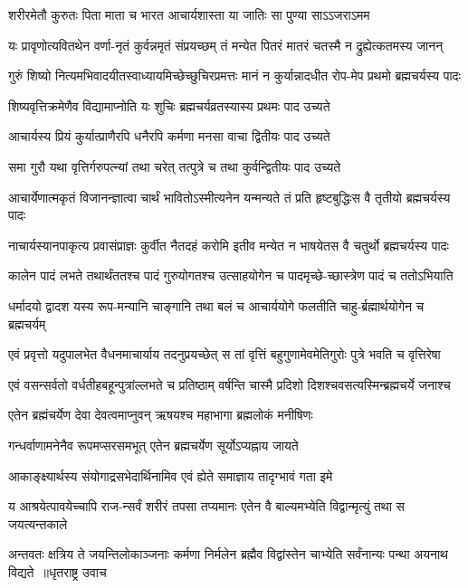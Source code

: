 \twolineshloka
{शरीरमेतौ कुरुतः पिता माता च भारत}
{आचार्यशास्ता या जातिः सा पुण्या साऽऽजराऽमम}


\twolineshloka
{यः प्रावृणोत्यवितथेन वर्णा-नृतं कुर्वन्नमृतं संप्रयच्छम्}
{तं मन्येत पितरं मातरं चतस्मै न द्रुह्येत्कतमस्य जानन्}


\twolineshloka
{गुरुं शिष्यो नित्यमभिवादयीतस्वाध्यायमिच्छेच्छुचिरप्रमत्तः}
{मानं न कुर्यान्नादधीत रोप-मेप प्रथमो ब्रह्मचर्यस्य पादः}


\twolineshloka
{शिष्यवृत्तिक्रमेणैव विद्यामाप्नोति यः शुचिः}
{ब्रह्मचर्यव्रतस्यास्य प्रथमः पाद उच्यते}


\twolineshloka
{आचार्यस्य प्रियं कुर्यात्प्राणैरपि धनैरपि}
{कर्मणा मनसा वाचा द्वितीयः पाद उच्यते}


\twolineshloka
{समा गुरौ यथा वृत्तिर्गरुपत्न्यां तथा चरेत्}
{तत्पुत्रे च तथा कुर्वन्द्वितीयः पाद उच्यते}


\twolineshloka
{आचार्येणात्मकृतं विजानन्ज्ञात्वा चार्थं भावितोऽस्मीत्यनेन}
{यन्मन्यते तं प्रति हृष्टबुद्धिःस वै तृतीयो ब्रह्मचर्यस्य पादः}


\twolineshloka
{नाचार्यस्यानपाकृत्य प्रवासंप्राज्ञः कुर्वीत नैतदहं करोमि}
{इतीव मन्येत न भाषयेतस वै चतुर्थो ब्रह्मचर्यस्य पादः}


\twolineshloka
{कालेन पादं लभते तथार्थंततश्च पादं गुरुयोगतश्च}
{उत्साहयोगेन च पादमृच्छे-च्छास्त्रेण पादं च ततोऽभियाति}


\twolineshloka
{धर्मादयो द्वादश यस्य रूप-मन्यानि चाङ्गानि तथा बलं च}
{आचार्ययोगे फलतीति चाहु-र्ब्रह्मार्थयोगेन च ब्रह्मचर्यम्}


\twolineshloka
{एवं प्रवृत्तो यदुपालभेत वैधनमाचार्याय तदनुप्रयच्छेत्}
{स तां वृत्तिं बहुगुणामेवमेतिगुरोः पुत्रे भवति च वृत्तिरेषा}


\twolineshloka
{एवं वसन्सर्वतो वर्धतीहबहून्पुत्रांल्लभते च प्रतिष्ठाम्}
{वर्षन्ति चास्मै प्रदिशो दिशश्चवसत्यस्मिन्ब्रह्मचर्ये जनाश्च}


\twolineshloka
{एतेन ब्रह्मंचर्येण देवा देवत्वमाप्नुवन्}
{ऋषयश्च महाभागा ब्रह्मलोकं मनीषिणः}


\twolineshloka
{गन्धर्वाणामनेनैव रूपमप्सरसमभूत्}
{एतेन ब्रह्मचर्येण सूर्योऽप्यह्नाय जायते}


\twolineshloka
{आकाङ्क्ष्यार्थस्य संयोगाद्रसभेदार्थिनामिव}
{एवं ह्येते समाज्ञाय तादृग्भावं गता इमे}


\twolineshloka
{य आश्रयेत्पावयेच्चापि राज-न्सर्वं शरीरं तपसा तप्यमानः}
{एतेन वै बाल्यमभ्येति विद्वान्मृत्युं तथा स जयत्यन्तकाले}


\threelineshloka
{अन्तवतः क्षत्रिय ते जयन्तिलोकाञ्जनाः कर्मणा निर्मलेन}
{ब्रह्मैव विद्वांस्तेन चाभ्येति सर्वंनान्यः पन्था अयनाथ विद्यते ॥धृतराष्ट्र उवाच}
{}


